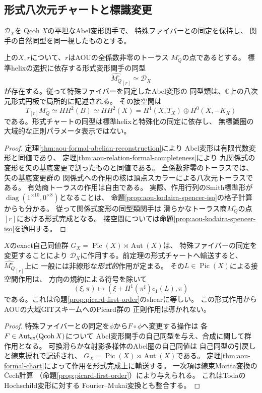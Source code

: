 \subsection{形式八次元チャートと標識変更}
$\mathcal D_X$を$\operatorname{Qcoh}X$の平坦なAbel変形関手で、
特殊ファイバーとの同定を保持し、
関手の自然同型を同一視したものとする。

\begin{theorem}[AOUの形式八次元チャート]
\label{thm:aou-formal-chart}
上の$X,r$について、$r$はAOUの全係数非零のトーラス
$M_Q^\circ$の点であるとする。
標準helixの選択に依存する形式変形関手の同型
\[
 \widehat{M_Q^\circ}_{[r]}\simeq \mathcal D_X
\]
が存在する。従って特殊ファイバーを同定したAbel変形の
同型類は、$\mathbb C$上の八次元形式円板で局所的に記述される。
その接空間は
\[
 T_{[r]}M_Q^\circ\simeq HH^2(B)\simeq HH^2(X)
 =H^1(X,T_X)\oplus H^0(X,-K_X)
\]
である。形式チャートの同型は標準helixと特殊化の同定に依存し、
無標識圏の大域的な正則パラメータ表示ではない。
\end{theorem}
\begin{proof}
定理\ref{thm:aou-formal-abelian-reconstruction}により
Abel変形は有限代数変形と同値であり、
定理\ref{thm:aou-relation-formal-completeness}により
九関係式の変形を矢の基底変更で割ったものと同値である。
全係数非零のトーラスでは、矢の基底変更群の
関係式への作用の核は頂点スカラーによる八次元トーラスである。
有効商トーラスの作用は自由である。
実際、作用行列のSmith標準形が
$\operatorname{diag}(1^{\times10},0^{\times8})$となることは、
命題\ref{prop:aou-kodaira-spencer-iso}の格子計算からも分かる。
従って関係式変形の同型類関手は
滑らかなトーラス商$M_Q^\circ$の点$[r]$における形式完成となる。
接空間については命題\ref{prop:aou-kodaira-spencer-iso}を適用する。
\end{proof}

\begin{proposition}[形式Picard作用と一次shear]
\label{prop:formal-picard-action}
$X$のexact自己同値群
$G_X=\operatorname{Pic}(X)\rtimes\operatorname{Aut}(X)$は、
特殊ファイバーの同定を変更することにより
$\mathcal D_X$に作用する。前定理の形式チャートへ輸送すると、
$\widehat{M_Q^\circ}_{[r]}$上に
一般には非線形な\emph{形式的}作用が定まる。
その$L\in\operatorname{Pic}(X)$による接空間作用は、
方向の規約による符号を除いて
\[
 (\xi,\pi)\longmapsto
 (\xi+H^1(\pi^\sharp)c_1(L),\pi)
\]
である。これは命題\ref{prop:picard-first-order}のshearに等しい。
この形式作用からAOUの大域GITスキームへのPicard群の
正則作用は導かれない。
\end{proposition}
\begin{proof}
特殊ファイバーとの同定を$\phi$から$F\circ\phi$へ変更する操作は
各$F\in\operatorname{Aut}_{\rm ex}(\operatorname{Qcoh}X)$について
Abel変形関手の自己同型を与え、合成に関して群作用となる。
可換滑らかな射影多様体のAbel圏の自己同値は
自己同型の引戻しと線束捩れで記述され、
$G_X=\operatorname{Pic}(X)\rtimes\operatorname{Aut}(X)$である。
定理\ref{thm:aou-formal-chart}によって作用を形式完成上に輸送する。
一次項は線束Morita変換のČech計算
（命題\ref{prop:picard-first-order}）により与えられる。
これはToda\cite{Toda}のHochschild変形に対する
Fourier--Mukai変換とも整合する。
\end{proof}

